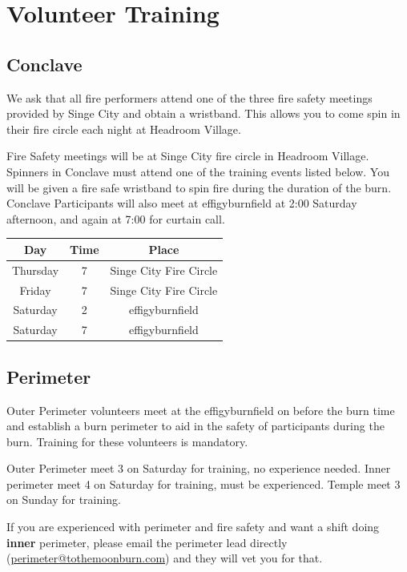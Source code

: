 \section*{Volunteer Training}

\subsection*{Conclave}
We ask that all fire performers attend one of the three fire safety meetings provided by Singe City and obtain a wristband. This allows you to come spin in their fire circle each night at Headroom Village.

Fire Safety meetings will be at Singe City fire circle in Headroom Village. Spinners in Conclave must attend one of the training events listed below. You will be given a fire safe wristband to spin fire during the duration of the burn. Conclave Participants will also meet at \gls{effigyburnfield} at 2:00\pm{} Saturday afternoon, and again at 7:00\pm{} for curtain call.

\begin{center}
\footnotesize
\begin{tabular}{|c|c|c|}
\hline
\textbf{Day} & \textbf{Time} & \textbf{Place} \\ \hline
Thursday & 7\pm{} & Singe City Fire Circle\\ \hline
Friday & 7\pm{} &  Singe City Fire Circle  \\ \hline
Saturday & 2\pm{} & \gls{effigyburnfield}  \\ \hline
Saturday & 7\pm{} & \gls{effigyburnfield}  \\ \hline
\end{tabular}
\end{center}


\subsection*{Perimeter}
Outer Perimeter volunteers meet at the \gls{effigyburnfield} on before the burn time and establish a burn perimeter to aid in the safety of participants during the burn. Training for these volunteers is mandatory.

Outer Perimeter meet 3\pm{} on Saturday for training, no experience needed.
Inner perimeter meet 4\pm{} on Saturday for training, must be experienced. Temple meet 3\pm{} on Sunday for training.

If you are experienced with perimeter and fire safety and want a shift doing \textbf{inner} perimeter, please email the perimeter lead directly (\url{perimeter@tothemoonburn.com}) and they will vet you for that.

